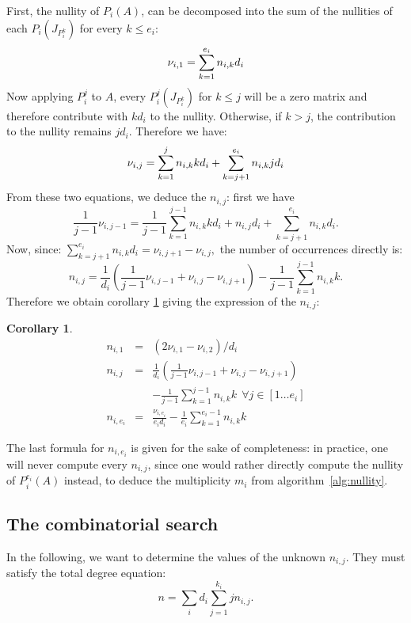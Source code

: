 \documentclass{article}
\newtheorem{cor}[thm]{Corollary}
\begin{document}
First, the nullity of $P_i(A)$,  can be decomposed
into the sum of the nullities of each $P_i(J_{P_i^k})$ for every $k\leq e_i$:
\begin{equation}
\nu_{i,1} = \sum_{k=1}^{e_i}{n_{i,k}d_i}\\ \label{eq:p1}
\end{equation}
Now applying $P_i^j$ to $A$, every $P_i^j(J_{P_i^k})$ for $k\leq j$
will be a zero matrix and therefore contribute with $kd_i$ to the
nullity. Otherwise, if $k > j$, the contribution to the nullity
remains $jd_i$. Therefore we have:
\begin{equation}
\nu_{i,j} = \sum_{k=1}^{j}{n_{i,k}kd_i} +  \sum_{k=j+1}^{e_i}{n_{i,k}jd_i}\\ \label{eq:pj}
\end{equation}
From these two equations, we deduce the $n_{i,j}$: first we have
$$
\frac{1}{j-1}\nu_{i,j-1} =  \frac{1}{j-1} \sum_{k=1}^{j-1} n_{i,k}kd_i +
n_{i,j}d_i + \sum_{k=j+1}^{e_i} n_{i,k} d_i.
$$
Now, since:
$  \sum_{k=j+1}^{e_i} n_{i,k}d_i = \nu_{i,j+1}-\nu_{i,j},$
the number of occurrences directly is:
$$
n_{i,j} = \frac{1}{d_i}\left(\frac{1}{j-1}\nu_{i,j-1}  + \nu_{i,j} -
\nu_{i,j+1}\right) - \frac{1}{j-1} \sum_{k=1}^{j-1} n_{i,k}k.
$$ 
Therefore we obtain corollary \ref{cor:occ} giving the expression of the $n_{i,j}$:
\begin{cor}\label{cor:occ}
\begin{eqnarray*}
n_{i,1} &=& (2\nu_{i,1}-\nu_{i,2})/d_i \\n_{i,j} &=& \frac{1}{d_i}\left(\frac{1}{j-1}\nu_{i,j-1}  + \nu_{i,j} -
\nu_{i,j+1}\right) \\
&&- \frac{1}{j-1} \sum_{k=1}^{j-1} n_{i,k}k \ \ \forall j \in
[1\dots e_i]\\
n_{i,e_i}&=& \frac{\nu_{i,e_i}}{e_id_i} - \frac{1}{e_i}\sum_{k=1}^{e_i-1}n_{i,k}k
\end{eqnarray*}
\end{cor}
The last formula for $n_{i,e_i}$ is given for the sake of completeness: 
in practice, one will never compute every $n_{i,j}$, since 
one would rather directly compute  the nullity of  $P_i^{e_i}(A)$ instead, to
deduce the multiplicity $m_i$ from algorithm~\ref{alg:nullity}.

\subsection{The combinatorial search}
\label{sec:combs}



In the following, we want to determine the values  of the unknown
$n_{i,j}$.
They must satisfy the total degree
equation:
\begin{equation}\label{eq:degree}
n = \sum_id_i\sum_{j=1}^{k_i}jn_{i,j}.
\end{equation}
\end{document}
